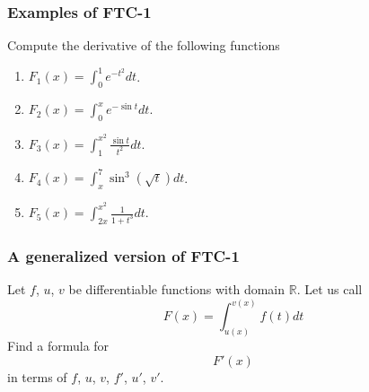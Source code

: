 \documentclass[14pt]{beamer}
\newcommand {\DS} [1] {${\displaystyle #1}$}
\newcommand {\R}{\mathbb{R}}
\newcommand{\setsize}[1]{\fontsize{#1}{#1}\selectfont} %
\newcommand{\smallerfont}{\setsize{13}} %
\begin{document}
\begin{frame}[t]
\smallerfont
\frametitle{Examples of FTC-1}

Compute the derivative of the following functions

	\begin{enumerate}
		\item  \DS{F_1(x) = \int_0^1 e^{-t^2} dt}. \\
	\vfill 
				
		\item   \DS{F_2(x) = \int_0^x e^{-\sin t} dt}. \\
	\vfill 
		
		\item  \DS{F_3(x) = \int_1^{x^2} \frac{\sin t}{t^2} dt}. \\
	\vfill 
		
		\item  \DS{F_4(x) = \! \int_x^7 \sin^3 \! \! \left( \sqrt{t} \right) \! dt}. \\
	\vfill 
		
		\item  \DS{F_5(x) = \int_{2x}^{x^2} \frac{1}{1+t^3} dt}. \\
	\end{enumerate}

\end{frame}
\begin{frame}[t]
\frametitle{A generalized version of FTC-1}

Let $f$, $u$, $v$ be differentiable functions with domain $\R$.
Let us call
	$$
		F(x) = \int_{u(x)}^{v(x)} f(t) dt
	$$
Find a formula for 
	$$
		F'(x)
	$$
in terms of $f$, $u$, $v$, $f'$, $u'$, $v'$.

\end{frame}
\end{document}

